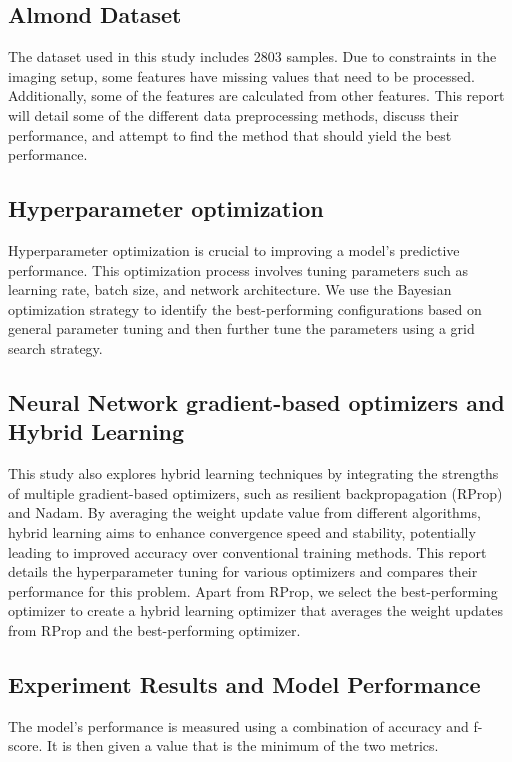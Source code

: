 \documentclass[conference]{IEEEtran}
\begin{document}
\subsection{Almond Dataset}

The dataset used in this study includes 2803 samples. Due to constraints in the imaging setup, some features have missing values that need to be processed. Additionally, some of the features are calculated from other features. This report will detail some of the different data preprocessing methods, discuss their performance, and attempt to find the method that should yield the best performance.

\subsection{Hyperparameter optimization}

Hyperparameter optimization is crucial to improving a model's predictive performance. This optimization process involves tuning parameters such as learning rate, batch size, and network architecture. We use the Bayesian optimization strategy to identify the best-performing configurations based on general parameter tuning and then further tune the parameters using a grid search strategy.

\subsection{Neural Network gradient-based optimizers and Hybrid Learning}

This study also explores hybrid learning techniques by integrating the strengths of multiple gradient-based optimizers, such as resilient backpropagation (RProp) and Nadam. By averaging the weight update value from different algorithms, hybrid learning aims to enhance convergence speed and stability, potentially leading to improved accuracy over conventional training methods. This report details the hyperparameter tuning for various optimizers and compares their performance for this problem. Apart from RProp, we select the best-performing optimizer to create a hybrid learning optimizer that averages the weight updates from RProp and the best-performing optimizer.

\subsection{Experiment Results and Model Performance}

The model's performance is measured using a combination of accuracy and f-score. It is then given a value that is the minimum of the two metrics.
\end{document}
